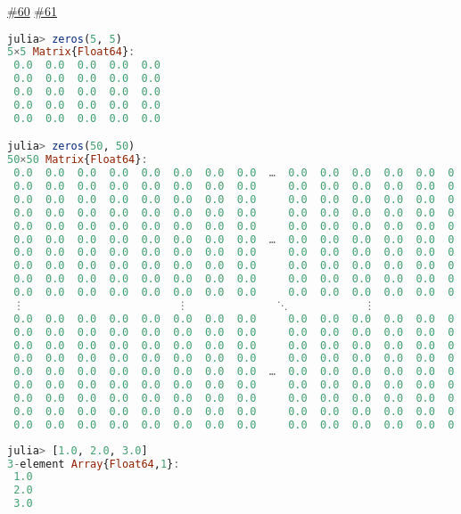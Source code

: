 \label{6314011214927757498}{}


\href{https://github.com/BambOoxX/Documenter.jl/issues/60}{\#60} \href{https://github.com/BambOoxX/Documenter.jl/issues/61}{\#61}




\begin{lstlisting}[language=julia, style=jlcodestyle]
julia> zeros(5, 5)
5×5 Matrix{Float64}:
 0.0  0.0  0.0  0.0  0.0
 0.0  0.0  0.0  0.0  0.0
 0.0  0.0  0.0  0.0  0.0
 0.0  0.0  0.0  0.0  0.0
 0.0  0.0  0.0  0.0  0.0

julia> zeros(50, 50)
50×50 Matrix{Float64}:
 0.0  0.0  0.0  0.0  0.0  0.0  0.0  0.0  …  0.0  0.0  0.0  0.0  0.0  0.0  0.0
 0.0  0.0  0.0  0.0  0.0  0.0  0.0  0.0     0.0  0.0  0.0  0.0  0.0  0.0  0.0
 0.0  0.0  0.0  0.0  0.0  0.0  0.0  0.0     0.0  0.0  0.0  0.0  0.0  0.0  0.0
 0.0  0.0  0.0  0.0  0.0  0.0  0.0  0.0     0.0  0.0  0.0  0.0  0.0  0.0  0.0
 0.0  0.0  0.0  0.0  0.0  0.0  0.0  0.0     0.0  0.0  0.0  0.0  0.0  0.0  0.0
 0.0  0.0  0.0  0.0  0.0  0.0  0.0  0.0  …  0.0  0.0  0.0  0.0  0.0  0.0  0.0
 0.0  0.0  0.0  0.0  0.0  0.0  0.0  0.0     0.0  0.0  0.0  0.0  0.0  0.0  0.0
 0.0  0.0  0.0  0.0  0.0  0.0  0.0  0.0     0.0  0.0  0.0  0.0  0.0  0.0  0.0
 0.0  0.0  0.0  0.0  0.0  0.0  0.0  0.0     0.0  0.0  0.0  0.0  0.0  0.0  0.0
 0.0  0.0  0.0  0.0  0.0  0.0  0.0  0.0     0.0  0.0  0.0  0.0  0.0  0.0  0.0
 ⋮                        ⋮              ⋱            ⋮
 0.0  0.0  0.0  0.0  0.0  0.0  0.0  0.0     0.0  0.0  0.0  0.0  0.0  0.0  0.0
 0.0  0.0  0.0  0.0  0.0  0.0  0.0  0.0     0.0  0.0  0.0  0.0  0.0  0.0  0.0
 0.0  0.0  0.0  0.0  0.0  0.0  0.0  0.0     0.0  0.0  0.0  0.0  0.0  0.0  0.0
 0.0  0.0  0.0  0.0  0.0  0.0  0.0  0.0     0.0  0.0  0.0  0.0  0.0  0.0  0.0
 0.0  0.0  0.0  0.0  0.0  0.0  0.0  0.0  …  0.0  0.0  0.0  0.0  0.0  0.0  0.0
 0.0  0.0  0.0  0.0  0.0  0.0  0.0  0.0     0.0  0.0  0.0  0.0  0.0  0.0  0.0
 0.0  0.0  0.0  0.0  0.0  0.0  0.0  0.0     0.0  0.0  0.0  0.0  0.0  0.0  0.0
 0.0  0.0  0.0  0.0  0.0  0.0  0.0  0.0     0.0  0.0  0.0  0.0  0.0  0.0  0.0
 0.0  0.0  0.0  0.0  0.0  0.0  0.0  0.0     0.0  0.0  0.0  0.0  0.0  0.0  0.0
\end{lstlisting}






\begin{lstlisting}[language=julia, style=jlcodestyle]
julia> [1.0, 2.0, 3.0]
3-element Array{Float64,1}:
 1.0
 2.0
 3.0

\end{lstlisting}




